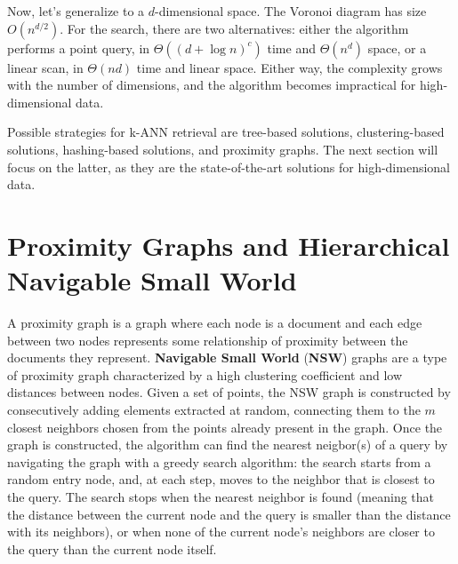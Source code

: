 Now, let's generalize to a $d$-dimensional space. The Voronoi diagram has size $O(n^{d/2})$. For the search, there are two alternatives: either the algorithm performs a point query, in $\Theta((d + \log n)^c)$ time and $\Theta(n^d)$ space, or a linear scan, in $\Theta(nd)$ time and linear space. Either way, the complexity grows with the number of dimensions, and the algorithm becomes impractical for high-dimensional data.

Possible strategies for k-ANN retrieval are tree-based solutions, clustering-based solutions, hashing-based solutions, and proximity graphs. The next section will focus on the latter, as they are the state-of-the-art solutions for high-dimensional data.

\section{Proximity Graphs and Hierarchical Navigable Small World}

A proximity graph is a graph where each node is a document and each edge between two nodes represents some relationship of proximity between the documents they represent. \textbf{Navigable Small World} (\textbf{NSW}) graphs are a type of proximity graph characterized by a high clustering coefficient and low distances between nodes. Given a set of points, the NSW graph is constructed by consecutively adding elements extracted at random, connecting them to the $m$ closest neighbors chosen from the points already present in the graph. Once the graph is constructed, the algorithm can find the nearest neigbor(s) of a query by navigating the graph with a greedy search algorithm: the search starts from a random entry node, and, at each step, moves to the neighbor that is closest to the query. The search stops when the nearest neighbor is found (meaning that the distance between the current node and the query is smaller than the distance with its neighbors), or when none of the current node's neighbors are closer to the query than the current node itself.

